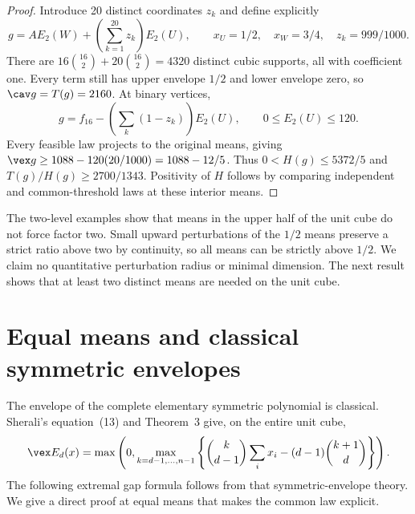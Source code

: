 \begin{proof}
Introduce 20 distinct coordinates $z_k$ and define explicitly
\begin{equation}\label{eq:unit-52}
 g=A E_2(W)+\left(\sum_{k=1}^{20}z_k\right)E_2(U),
 \qquad x_U=1/2,\quad x_W=3/4,\quad z_k=999/1000.
\end{equation}
There are $16\binom{16}{2}+20\binom{16}{2}=4320$ distinct cubic
supports, all with coefficient one. Every term still has upper envelope
$1/2$ and lower envelope zero, so $\cav g=T(g)=2160$. At binary vertices,
\[
 g=f_{16}-\left(\sum_k(1-z_k)\right)E_2(U),\qquad
 0\le E_2(U)\le120.
\]
Every feasible law projects to the original means, giving
$\vex g\ge1088-120(20/1000)=1088-12/5$.
Thus $0<H(g)\le5372/5$ and $T(g)/H(g)\ge2700/1343$.
Positivity of $H$ follows by comparing independent and common-threshold
laws at these interior means.
\end{proof}

The two-level examples show that means in the upper half of the unit
cube do not force factor two. Small upward perturbations of the $1/2$
means preserve a strict ratio above two by continuity, so all means can
be strictly above $1/2$. We claim no quantitative perturbation radius or
minimal dimension. The
next result shows that at least two distinct means are needed on the unit
cube.

\section{Equal means and classical symmetric envelopes}\label{sec:equal-means}
The envelope of the complete elementary symmetric polynomial is classical.
Sherali's equation~(13) and Theorem~3 \citep[pp.~252--253]{Sherali1997}
give, on the entire unit cube,
\begin{equation}\label{eq:sherali-symmetric}
 \vex E_d(x)=\max\left(0,
  \max_{k=d-1,\ldots,n-1}
  \left\{\binom{k}{d-1}\sum_i x_i-(d-1)\binom{k+1}{d}\right\}\right).
\end{equation}
The following extremal gap formula follows from that symmetric-envelope
theory. We give a direct proof at equal means that makes the common law
explicit.

